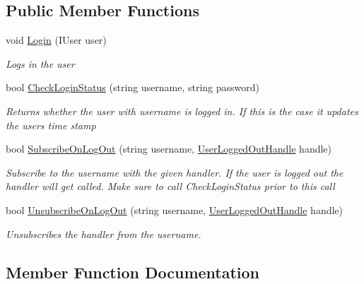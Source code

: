 \subsection*{Public Member Functions}
\begin{DoxyCompactItemize}
\item 
void \mbox{\hyperlink{interface_application_1_1_interfaces_1_1_i_login_manager_abfad12b55f211087464278f6301ba2e6}{Login}} (I\+User user)
\begin{DoxyCompactList}\small\item\em Logs in the user \end{DoxyCompactList}\item 
bool \mbox{\hyperlink{interface_application_1_1_interfaces_1_1_i_login_manager_a31282ac878dc798af1a542f23efc7c8b}{Check\+Login\+Status}} (string username, string password)
\begin{DoxyCompactList}\small\item\em Returns whether the user with username is logged in. If this is the case it updates the users time stamp \end{DoxyCompactList}\item 
bool \mbox{\hyperlink{interface_application_1_1_interfaces_1_1_i_login_manager_a81fc028c701e8e372d635d6bd9664570}{Subscribe\+On\+Log\+Out}} (string username, \mbox{\hyperlink{namespace_application_1_1_interfaces_a3ba96a057acca29f3e2e533aeb2f30e0}{User\+Logged\+Out\+Handle}} handle)
\begin{DoxyCompactList}\small\item\em Subscribe to the username with the given handler. If the user is logged out the handler will get called. Make sure to call Check\+Login\+Status prior to this call \end{DoxyCompactList}\item 
bool \mbox{\hyperlink{interface_application_1_1_interfaces_1_1_i_login_manager_aeb60a7935fa777e629db6098ce2f458d}{Unsubscribe\+On\+Log\+Out}} (string username, \mbox{\hyperlink{namespace_application_1_1_interfaces_a3ba96a057acca29f3e2e533aeb2f30e0}{User\+Logged\+Out\+Handle}} handle)
\begin{DoxyCompactList}\small\item\em Unsubscribes the handler from the username. \end{DoxyCompactList}\end{DoxyCompactItemize}


\subsection{Member Function Documentation}
\mbox{\label{interface_application_1_1_interfaces_1_1_i_login_manager_a31282ac878dc798af1a542f23efc7c8b}} 
